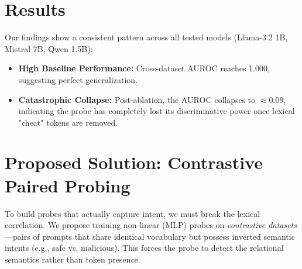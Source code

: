 \documentclass{article}
\begin{document}
\section{Results}
Our findings show a consistent pattern across all tested models (Llama-3.2 1B, Mistral 7B, Qwen 1.5B):
\begin{itemize}
    \item \textbf{High Baseline Performance:} Cross-dataset AUROC reaches 1.000, suggesting perfect generalization.
    \item \textbf{Catastrophic Collapse:} Post-ablation, the AUROC collapses to $\approx 0.09$, indicating the probe has completely lost its discriminative power once lexical "cheat" tokens are removed.
\end{itemize}

\section{Proposed Solution: Contrastive Paired Probing}
To build probes that actually capture intent, we must break the lexical correlation. We propose training non-linear (MLP) probes on \textit{contrastive datasets}---pairs of prompts that share identical vocabulary but possess inverted semantic intents (e.g., safe vs. malicious). This forces the probe to detect the relational semantics rather than token presence.
\end{document}
